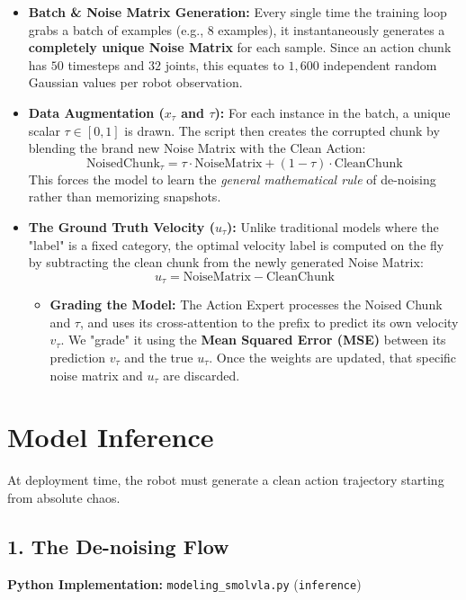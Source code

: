 \documentclass[11pt,a4paper]{article}
\begin{document}
\begin{itemize}
    \item \textbf{Batch \& Noise Matrix Generation:} Every single time the training loop grabs a batch of examples (e.g., $8$ examples), it instantaneously generates a \textbf{completely unique Noise Matrix} for each sample. Since an action chunk has $50$ timesteps and $32$ joints, this equates to $1,600$ independent random Gaussian values per robot observation.
    
    \item \textbf{Data Augmentation ($x_\tau$ and $\tau$):} For each instance in the batch, a unique scalar $\tau \in [0, 1]$ is drawn. The script then creates the corrupted chunk by blending the brand new Noise Matrix with the Clean Action:
    \[ \text{NoisedChunk}_{\tau} = \tau \cdot \text{NoiseMatrix} + (1 - \tau) \cdot \text{CleanChunk} \]
    This forces the model to learn the \textit{general mathematical rule} of de-noising rather than memorizing snapshots.

    \item \textbf{The Ground Truth Velocity ($u_\tau$):} Unlike traditional models where the "label" is a fixed category, the optimal velocity label is computed on the fly by subtracting the clean chunk from the newly generated Noise Matrix:
    \[ u_\tau = \text{NoiseMatrix} - \text{CleanChunk} \]
    \begin{itemize}
        \item \textbf{Grading the Model:} The Action Expert processes the Noised Chunk and $\tau$, and uses its cross-attention to the prefix to predict its own velocity $v_\tau$. We "grade" it using the \textbf{Mean Squared Error (MSE)} between its prediction $v_\tau$ and the true $u_\tau$. Once the weights are updated, that specific noise matrix and $u_\tau$ are discarded.
    \end{itemize}
\end{itemize}

\section{Model Inference}
At deployment time, the robot must generate a clean action trajectory starting from absolute chaos.

\subsection{1. The De-noising Flow}
\textbf{Python Implementation:} \texttt{modeling\_smolvla.py} (\texttt{inference})
\end{document}

